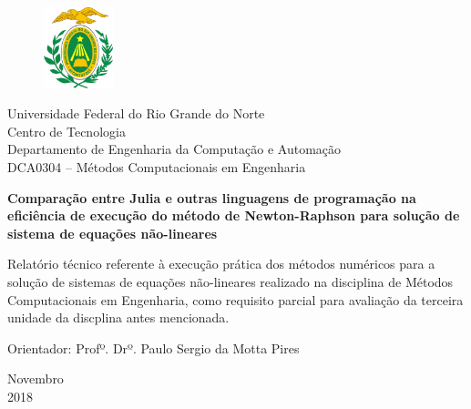 \documentclass[a4paper, 12pt, openright, oneside]{article}
\begin{document}
\begin{titlepage}
	\begin{center}
	
	\begin{figure}[!ht]
	\centering
	\includegraphics[width=2cm]{./ufrn.jpg}
	\end{figure}

		Universidade Federal do Rio Grande do Norte\\
		Centro de Tecnologia\\
		Departamento de Engenharia da Computação e Automação\\
		DCA0304 -- Métodos Computacionais em Engenharia\\
\vspace{15pt}
        
        \vspace{85pt}
        
		\textbf{\large{Comparação entre Julia e outras linguagens de programação na eficiência de execução do método de Newton-Raphson para solução de sistema de equações não-lineares}}\\
			
	\end{center}
\vspace{1,5cm}
	
	\begin{flushright}

   \begin{list}{}{
      \setlength{\leftmargin}{4.5cm}
      \setlength{\rightmargin}{0cm}
      \setlength{\labelwidth}{0pt}
      \setlength{\labelsep}{\leftmargin}}

      \item Relatório técnico referente à execução prática dos métodos numéricos para a solução de sistemas de equações não-lineares realizado na disciplina de Métodos Computacionais em Engenharia, como requisito parcial para avaliação da terceira unidade da discplina antes mencionada.

      \begin{list}{}{
      \setlength{\leftmargin}{0cm}
      \setlength{\rightmargin}{0cm}
      \setlength{\labelwidth}{0pt}
      \setlength{\labelsep}{\leftmargin}}


            \item Orientador: Profº. Drº. Paulo Sergio da Motta Pires

      \end{list}
   \end{list}
\end{flushright}
\vspace{1cm}
\begin{center}
		\vspace{\fill}
		 Novembro\\2018
			\end{center}
\end{titlepage}
\end{document}
